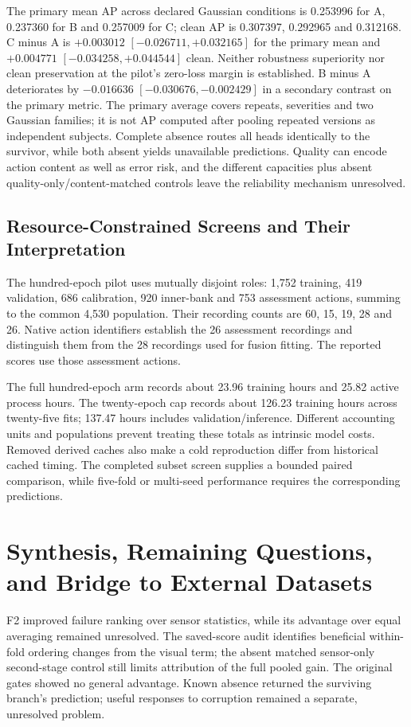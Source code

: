 The primary mean AP across declared Gaussian conditions is 0.253996 for A, 0.237360 for
B and 0.257009 for C; clean AP is 0.307397, 0.292965 and 0.312168. C minus A is
$+0.003012$ $[-0.026711, +0.032165]$ for the primary mean and $+0.004771$
$[-0.034258, +0.044544]$ clean. Neither robustness superiority nor clean preservation at
the pilot's zero-loss margin is established. B minus A deteriorates by $-0.016636$
$[-0.030676, -0.002429]$ in a secondary contrast on the primary metric. The primary
average covers repeats, severities and two Gaussian families; it is not AP computed
after pooling repeated versions as independent subjects. Complete absence routes all
heads identically to the survivor, while both absent yields unavailable predictions.
Quality can encode action content as well as error risk, and the different capacities
plus absent quality-only/content-matched controls leave the reliability mechanism
unresolved.

\subsection{Resource-Constrained Screens and Their Interpretation}
The hundred-epoch pilot uses mutually disjoint roles: 1,752 training, 419 validation,
686 calibration, 920 inner-bank and 753 assessment actions, summing to the common 4,530
population. Their recording counts are 60, 15, 19, 28 and 26. Native action identifiers establish the 26 assessment recordings and distinguish them
from the 28 recordings used for fusion fitting. The reported scores use those
assessment actions.

The full hundred-epoch arm records about 23.96 training hours and 25.82 active process
hours. The twenty-epoch cap records about 126.23 training hours across twenty-five fits;
137.47 hours includes validation/inference. Different accounting units and populations
prevent treating these totals as intrinsic model costs. Removed derived caches also make
a cold reproduction differ from historical cached timing. The completed subset screen
supplies a bounded paired comparison, while five-fold or multi-seed performance requires
the corresponding predictions.

\section{Synthesis, Remaining Questions, and Bridge to External Datasets}
F2 improved failure ranking over sensor statistics, while its advantage over equal
averaging remained unresolved. The saved-score audit identifies beneficial within-fold
ordering changes from the visual term; the absent matched sensor-only second-stage
control still limits attribution of the full pooled gain. The original gates showed no
general advantage. Known absence returned the surviving branch's prediction; useful
responses to corruption remained a separate, unresolved problem.

